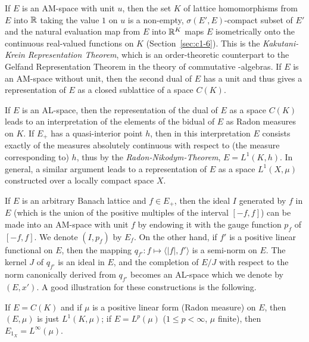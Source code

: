 If $ E $ is an AM-space with unit $ u $, then the set $ K $ of lattice homomorphisms from $ E $ into $ \mathbb{R} $ taking the value $ 1 $ on $ u $ is a non-empty, $ \sigma(E',E) $-compact subset of $ E' $ and the natural evaluation map from $ E $ into $ \mathbb{R}^{K} $ maps $ E $ isometrically onto the continuous real-valued functions on $ K $ (\cf  Section~\ref{sec:c1-6}).
This is the \emph{Kakutani-Krein Representation Theorem}, which is an order-theoretic counterpart to the Gelfand Representation Theorem in the theory of commutative \CA-algebras.
If $ E $ is an AM-space without unit, then the second dual of $ E $ has a unit and thus gives a representation of $ E $ as a closed sublattice of a space $ C(K) $.

If $ E $ is an AL-space, then the representation of the dual of $ E $ as a space $ C(K) $ leads to an interpretation of the elements of the bidual of $ E $ as Radon measures on $ K $.
If $ E_{+} $ has a quasi-interior point $ h $, then in this interpretation $ E $ consists exactly of the measures absolutely continuous with respect to (the measure corresponding to) $ h $, thus by the \emph{Radon-Nikodym-Theorem}, $ E = L^{1}(K,h) $.
In general, a similar argument leads to a representation of $ E $ as a space $ L^{1}(X,\mu) $ constructed over a locally compact space $ X $.

If $ E $ is an arbitrary Banach lattice and $ f \in E_{+} $, then the ideal $ I $ generated by $ f $ in $ E $ (which is the union of the positive multiples of the interval $ [-f,f] $) can be made into an AM-space with unit $ f $ by endowing it with the gauge function $ p_{f} $ of $ [-f,f] $.
We denote $ (I,p_{f}) $ by $ E_{f} $.
On the other hand, if $ f' $ is a positive linear functional on $ E $, then the mapping $ q_{f'} \colon f \mapsto \langle |f|,f'\rangle $ is a semi-norm on $ E $.
The kernel $ J $ of $ q_{f'} $ is an ideal in $ E $, and the completion of $ E/J $ with respect to the norm canonically derived from $ q_{f'} $ becomes an AL-space which we denote by $ (E,x') $.
A good illustration for these constructions is the following.

If $ E = C(K) $ and if $ \mu $ is a positive linear form (Radon measure) on $ E $, then $ (E,\mu) $ is just $ L^{1}(K,\mu) $;
if $ E = L^{p}(\mu) $ ($ 1 \leq p < \infty $, $ \mu $ finite), then $ E_{1_{X}} = L^{\infty}(\mu) $.
